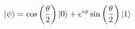 \documentclass{article}
\begin{document}
    \begin{equation}
        \ket{\psi} = \cos \left( \frac{\theta}{2} \right) \ket{0} + e^{i \phi} \sin \left( \frac{\theta}{2} \right)\ket{1}
    \end{equation}
\end{document}
